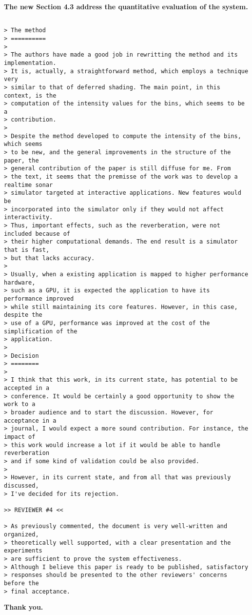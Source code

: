 \documentclass{article}
\begin{document}
\textbf{The new Section 4.3 address the quantitative evaluation of the system.}

\begin{verbatim}

> The method
> ==========
>
> The authors have made a good job in rewritting the method and its implementation.
> It is, actually, a straightforward method, which employs a technique very
> similar to that of deferred shading. The main point, in this context, is the
> computation of the intensity values for the bins, which seems to be a
> contribution.
>
> Despite the method developed to compute the intensity of the bins, which seems
> to be new, and the general improvements in the structure of the paper, the
> general contribution of the paper is still diffuse for me. From
> the text, it seems that the premisse of the work was to develop a realtime sonar
> simulator targeted at interactive applications. New features would be
> incorporated into the simulator only if they would not affect interactivity.
> Thus, important effects, such as the reverberation, were not included because of
> their higher computational demands. The end result is a simulator that is fast,
> but that lacks accuracy.
>
> Usually, when a existing application is mapped to higher performance hardware,
> such as a GPU, it is expected the application to have its performance improved
> while still maintaining its core features. However, in this case, despite the
> use of a GPU, performance was improved at the cost of the simplification of the
> application.
>
> Decision
> ========
>
> I think that this work, in its current state, has potential to be accepted in a
> conference. It would be certainly a good opportunity to show the work to a
> broader audience and to start the discussion. However, for acceptance in a
> journal, I would expect a more sound contribution. For instance, the impact of
> this work would increase a lot if it would be able to handle reverberation
> and if some kind of validation could be also provided.
>
> However, in its current state, and from all that was previously discussed,
> I've decided for its rejection.

>> REVIEWER #4 <<

> As previously commented, the document is very well-written and organized,
> theoretically well supported, with a clear presentation and the experiments
> are sufficient to prove the system effectiveness.
> Although I believe this paper is ready to be published, satisfactory
> responses should be presented to the other reviewers' concerns before the
> final acceptance.

\end{verbatim}

\textbf{Thank you.}
\end{document}
